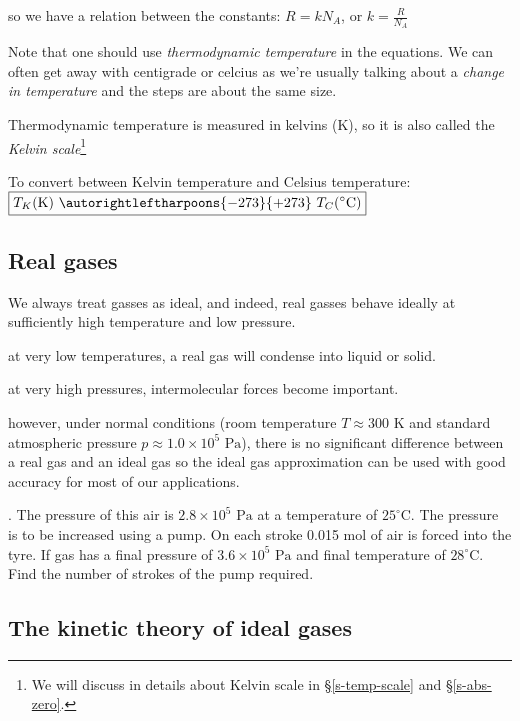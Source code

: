 \documentclass[a4paper,12pt]{book}
\newcommand{\OC}{^{\circ}\text{C}}
\newcommand{\tcbhighmath}[1]{\boxed{#1}}
\begin{document}
so we have a relation between the constants: $R = kN_A$, or $k=\frac{R}{N_A}$

Note that one should use \emph{thermodynamic temperature} in the equations. We can often get away with centigrade or celcius as we're usually talking about a \emph{change in temperature} and the steps are about the same size.

Thermodynamic temperature is measured in kelvins (K), so it is also called the \emph{Kelvin scale}\footnote{We will discuss in details about Kelvin scale in \S\ref{s-temp-scale} and \S\ref{s-abs-zero}.}

To convert between Kelvin temperature and Celsius temperature: $\tcbhighmath{T_K (\text{K}) \text{ } \autorightleftharpoons{\footnotesize -273}{\footnotesize +273} \text{ } T_C (\OC)}$

\subsection*{Real gases}

We always treat gasses as ideal, and indeed, real gasses behave ideally at sufficiently high temperature and low pressure.

\begin{compactitem}
	\item[--] at very low temperatures, a real gas will condense into liquid or solid.
	
	\item[--] at very high pressures, intermolecular forces become important.
\end{compactitem}

however, under normal conditions (room temperature $T \approx 300 \text{ K}$ and standard atmospheric pressure $p \approx 1.0\times10^5 \text{ Pa}$), there is no significant difference between a real gas and an ideal gas so the ideal gas approximation can be used with good accuracy for most of our applications.

\newpage %

. The pressure of this air is $2.8\times10^5 \text{ Pa}$ at a temperature of $25^\circ$C. The pressure is to be increased using a pump. On each stroke 0.015 mol of air is forced into the tyre. If gas has a final pressure of $3.6\times10^5 \text{ Pa}$ and final temperature of $28^\circ$C. Find the number of strokes of the pump required.

\subsection{The kinetic theory of ideal gases}
\end{document}
